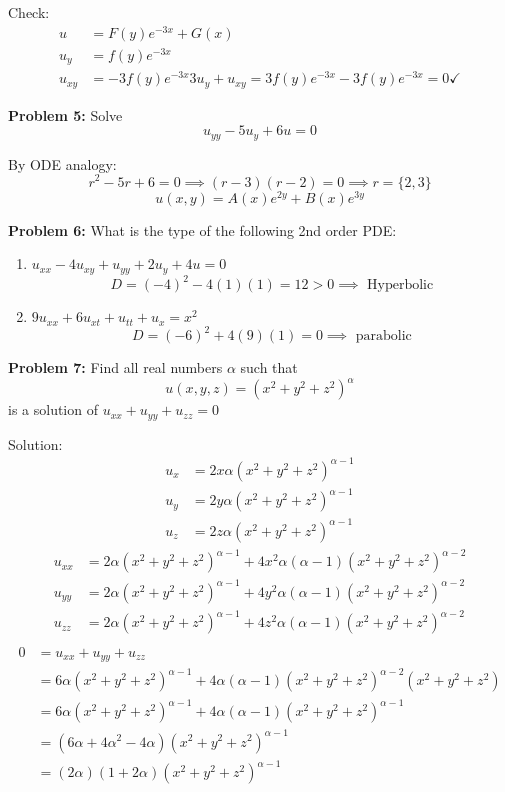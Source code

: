 \documentclass[12pt]{article}
\newcommand{\ans}[1]{\boxed{\text{#1}}}
\begin{document}
Check:
\begin{align*}
    u &= F(y) e^{-3x} + G(x)\\
    u_y &= f(y) e^{-3x}\\
    u_{xy} &= -3f(y) e^{-3x}
    3u_y + u_{xy} = 3f(y) e^{-3x} -3f(y) e^{-3x} = 0 \checkmark
\end{align*}
\pagebreak 

\textbf{Problem 5:} Solve 
\[u_{yy} - 5u_y + 6u = 0\]

By ODE analogy:
\[r^2 - 5r + 6 = 0 \implies (r - 3)(r - 2) = 0 \implies r = \{2, 3\}\]
\[\ans{$u(x, y) = A(x)e^{2y} + B(x)e^{3y}$}\]

\pagebreak 

\textbf{Problem 6:} What is the type of the following 2nd order PDE:
\begin{enumerate}
    \item $u_{xx} - 4u_{xy} + u_{yy} + 2u_y + 4u = 0$
    \[D = (-4)^2 - 4(1)(1) = 12 > 0 \implies \ans{ Hyperbolic}\]
    \item $9u_{xx} + 6u_{xt} + u_{tt} + u_x = x^2$
    \[D = (-6)^2 + 4(9)(1) = 0 \implies \ans{ parabolic}\]
\end{enumerate}

\pagebreak 

\textbf{Problem 7:} Find all real numbers $\alpha$ such that 
\[u(x, y, z) = (x^2 + y^2 + z^2)^\alpha\]
is a solution of $u_{xx} + u_{yy} + u_{zz} = 0$

Solution:
\begin{align*}
    u_x &= 2x\alpha(x^2 + y^2 + z^2)^{\alpha - 1}\\
    u_y &= 2y\alpha(x^2 + y^2 + z^2)^{\alpha - 1}\\
    u_z &= 2z\alpha(x^2 + y^2 + z^2)^{\alpha - 1}
\end{align*}
\begin{align*}
    u_{xx} &= 2\alpha(x^2 + y^2 + z^2)^{\alpha - 1} + 4x^2\alpha(\alpha - 1)(x^2 + y^2 + z^2)^{\alpha - 2}\\
    u_{yy} &= 2\alpha(x^2 + y^2 + z^2)^{\alpha - 1} + 4y^2\alpha(\alpha - 1)(x^2 + y^2 + z^2)^{\alpha - 2}\\
    u_{zz} &= 2\alpha(x^2 + y^2 + z^2)^{\alpha - 1} + 4z^2\alpha(\alpha - 1)(x^2 + y^2 + z^2)^{\alpha - 2}\\
\end{align*}
\begin{align*}
    0 &= u_{xx} + u_{yy} + u_{zz} \\
    &= 6\alpha(x^2 + y^2 + z^2)^{\alpha - 1} + 4\alpha(\alpha - 1)(x^2 + y^2 + z^2)^{\alpha - 2}(x^2 + y^2 + z^2)\\
    &= 6\alpha(x^2 + y^2 + z^2)^{\alpha - 1} + 4\alpha(\alpha - 1)(x^2 + y^2 + z^2)^{\alpha - 1}\\
    &= (6\alpha + 4\alpha^2 - 4\alpha)(x^2 + y^2 + z^2)^{\alpha - 1}\\
    &= (2\alpha)(1 + 2\alpha)(x^2 + y^2 + z^2)^{\alpha - 1}\\
\end{align*}
\end{document}
